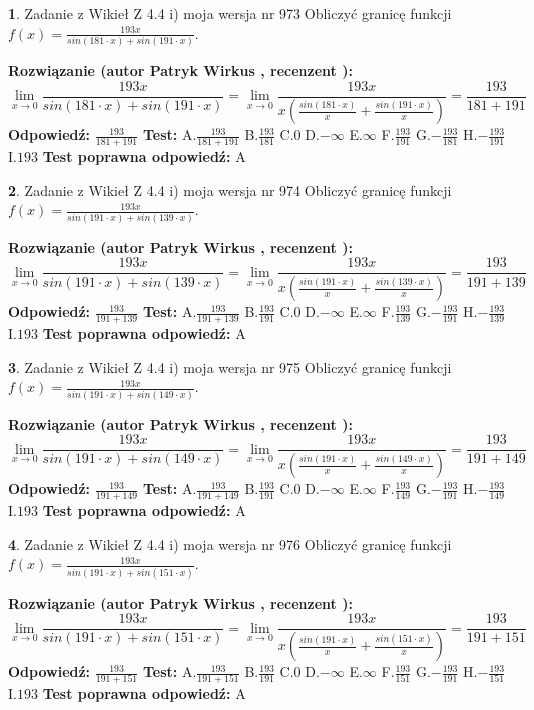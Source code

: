 \documentclass[12pt, a4paper]{article}
\theoremstyle{definition} %
\newtheorem{zad}{}
\newcommand{\zadStart}[1]{\begin{zad}#1\newline}
\newcommand{\zadStop}{\end{zad}}
\newcommand{\rozwStart}[2]{\noindent \textbf{Rozwiązanie (autor #1 , recenzent #2): }\newline}
\newcommand{\rozwStop}{\newline}
\newcommand{\odpStart}{\noindent \textbf{Odpowiedź:}\newline}
\newcommand{\odpStop}{\newline}
\newcommand{\testStart}{\noindent \textbf{Test:}\newline}
\newcommand{\testStop}{\newline}
\newcommand{\kluczStart}{\noindent \textbf{Test poprawna odpowiedź:}\newline}
\newcommand{\kluczStop}{\newline}
\begin{document}
\zadStart{Zadanie z Wikieł Z 4.4 i) moja wersja nr 973}
Obliczyć granicę funkcji $f(x)=\frac{193x}{sin(181\cdot x) +sin(191\cdot x)}$.
\zadStop
\rozwStart{Patryk Wirkus}{}
$$\lim\limits_{x\to 0}\frac{193x}{sin(181\cdot x) +sin(191\cdot x)}=\lim\limits_{x\to 0}\frac{193x}{x(\frac{sin(181\cdot x)}{x}+\frac{sin(191\cdot x)}{x})}=\frac{193}{181+191}$$
\rozwStop
\odpStart
$\frac{193}{181+191}$
\odpStop
\testStart
A.$\frac{193}{181+191}$
B.$\frac{193}{181}$
C.$0$
D.$-\infty$
E.$\infty$
F.$\frac{193}{191}$
G.$-\frac{193}{181}$
H.$-\frac{193}{191}$
I.$193$
\testStop
\kluczStart
A
\kluczStop



\zadStart{Zadanie z Wikieł Z 4.4 i) moja wersja nr 974}
Obliczyć granicę funkcji $f(x)=\frac{193x}{sin(191\cdot x) +sin(139\cdot x)}$.
\zadStop
\rozwStart{Patryk Wirkus}{}
$$\lim\limits_{x\to 0}\frac{193x}{sin(191\cdot x) +sin(139\cdot x)}=\lim\limits_{x\to 0}\frac{193x}{x(\frac{sin(191\cdot x)}{x}+\frac{sin(139\cdot x)}{x})}=\frac{193}{191+139}$$
\rozwStop
\odpStart
$\frac{193}{191+139}$
\odpStop
\testStart
A.$\frac{193}{191+139}$
B.$\frac{193}{191}$
C.$0$
D.$-\infty$
E.$\infty$
F.$\frac{193}{139}$
G.$-\frac{193}{191}$
H.$-\frac{193}{139}$
I.$193$
\testStop
\kluczStart
A
\kluczStop



\zadStart{Zadanie z Wikieł Z 4.4 i) moja wersja nr 975}
Obliczyć granicę funkcji $f(x)=\frac{193x}{sin(191\cdot x) +sin(149\cdot x)}$.
\zadStop
\rozwStart{Patryk Wirkus}{}
$$\lim\limits_{x\to 0}\frac{193x}{sin(191\cdot x) +sin(149\cdot x)}=\lim\limits_{x\to 0}\frac{193x}{x(\frac{sin(191\cdot x)}{x}+\frac{sin(149\cdot x)}{x})}=\frac{193}{191+149}$$
\rozwStop
\odpStart
$\frac{193}{191+149}$
\odpStop
\testStart
A.$\frac{193}{191+149}$
B.$\frac{193}{191}$
C.$0$
D.$-\infty$
E.$\infty$
F.$\frac{193}{149}$
G.$-\frac{193}{191}$
H.$-\frac{193}{149}$
I.$193$
\testStop
\kluczStart
A
\kluczStop



\zadStart{Zadanie z Wikieł Z 4.4 i) moja wersja nr 976}
Obliczyć granicę funkcji $f(x)=\frac{193x}{sin(191\cdot x) +sin(151\cdot x)}$.
\zadStop
\rozwStart{Patryk Wirkus}{}
$$\lim\limits_{x\to 0}\frac{193x}{sin(191\cdot x) +sin(151\cdot x)}=\lim\limits_{x\to 0}\frac{193x}{x(\frac{sin(191\cdot x)}{x}+\frac{sin(151\cdot x)}{x})}=\frac{193}{191+151}$$
\rozwStop
\odpStart
$\frac{193}{191+151}$
\odpStop
\testStart
A.$\frac{193}{191+151}$
B.$\frac{193}{191}$
C.$0$
D.$-\infty$
E.$\infty$
F.$\frac{193}{151}$
G.$-\frac{193}{191}$
H.$-\frac{193}{151}$
I.$193$
\testStop
\kluczStart
A
\kluczStop
\end{document}
